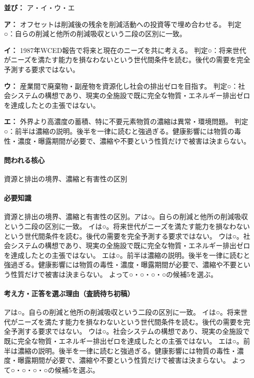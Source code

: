 \noindent\textbf{並び：} ア・イ・ウ・エ\par

\noindent\textbf{ア：} オフセットは削減後の残余を削減活動への投資等で埋め合わせる。 判定○：自らの削減と他所の削減吸収という二段の区別に一致。\par

\noindent\textbf{イ：} 1987年WCED報告で将来と現在のニーズを共に考える。 判定○：将来世代がニーズを満たす能力を損なわないという世代間条件を読む。後代の需要を完全予測する要求ではない。\par

\noindent\textbf{ウ：} 産業間で廃棄物・副産物を資源化し社会の排出ゼロを目指す。 判定○：社会システムの構想であり、現実の全施設で既に完全な物質・エネルギー排出ゼロを達成したとの主張ではない。\par

\noindent\textbf{エ：} 外界より高濃度の蓄積、特に不要元素物質の濃縮は異常・環境問題。 判定○：前半は濃縮の説明。後半を一律に読むと強過ぎる。健康影響には物質の毒性・濃度・曝露期間が必要で、濃縮や不要という性質だけで被害は決まらない。\par

\paragraph{問われる核心} 資源と排出の境界、濃縮と有害性の区別

\paragraph{必要知識} 資源と排出の境界、濃縮と有害性の区別。アは○。自らの削減と他所の削減吸収という二段の区別に一致。 イは○。将来世代がニーズを満たす能力を損なわないという世代間条件を読む。後代の需要を完全予測する要求ではない。 ウは○。社会システムの構想であり、現実の全施設で既に完全な物質・エネルギー排出ゼロを達成したとの主張ではない。 エは○。前半は濃縮の説明。後半を一律に読むと強過ぎる。健康影響には物質の毒性・濃度・曝露期間が必要で、濃縮や不要という性質だけで被害は決まらない。 よって○・○・○・○の候補5を選ぶ。

\paragraph{考え方・正答を選ぶ理由（査読待ち初稿）} アは○。自らの削減と他所の削減吸収という二段の区別に一致。 イは○。将来世代がニーズを満たす能力を損なわないという世代間条件を読む。後代の需要を完全予測する要求ではない。 ウは○。社会システムの構想であり、現実の全施設で既に完全な物質・エネルギー排出ゼロを達成したとの主張ではない。 エは○。前半は濃縮の説明。後半を一律に読むと強過ぎる。健康影響には物質の毒性・濃度・曝露期間が必要で、濃縮や不要という性質だけで被害は決まらない。 よって○・○・○・○の候補5を選ぶ。

